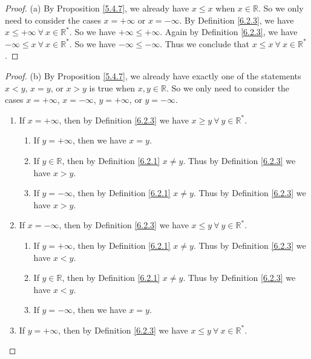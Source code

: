 \begin{proof}{(a)}
By Proposition \ref{5.4.7}, we already have \(x \leq x\) when \(x \in \mathds{R}\).
So we only need to consider the cases \(x = +\infty\) or \(x = -\infty\).
By Definition \ref{6.2.3}, we have \(x \leq +\infty \ \forall\ x \in \mathds{R}^*\).
So we have \(+\infty \leq +\infty\).
Again by Definition \ref{6.2.3}, we have \(-\infty \leq x \ \forall\ x \in \mathds{R}^*\).
So we have \(-\infty \leq -\infty\).
Thus we conclude that \(x \leq x \ \forall\ x \in \mathds{R}^*\).
\end{proof}

\begin{proof}{(b)}
By Proposition \ref{5.4.7}, we already have exactly one of the statements \(x < y\), \(x = y\), or \(x > y\) is true when \(x, y \in \mathds{R}\).
So we only need to consider the cases \(x = +\infty\), \(x = -\infty\), \(y = +\infty\), or \(y = -\infty\).
\begin{enumerate}[label=(\Roman*)]
    \item If \(x = +\infty\), then by Definition \ref{6.2.3} we have \(x \geq y \ \forall\ y \in \mathds{R}^*\).
    \begin{enumerate}[label=(\roman*)]
        \item If \(y = +\infty\), then we have \(x = y\).
        \item If \(y \in \mathds{R}\), then by Definition \ref{6.2.1} \(x \neq y\).
        Thus by Definition \ref{6.2.3} we have \(x > y\).
        \item If \(y = -\infty\), then by Definition \ref{6.2.1} \(x \neq y\).
        Thus by Definition \ref{6.2.3} we have \(x > y\).
    \end{enumerate}
    \item If \(x = -\infty\), then by Definition \ref{6.2.3} we have \(x \leq y \ \forall\ y \in \mathds{R}^*\).
    \begin{enumerate}[label=(\roman*)]
        \item If \(y = +\infty\), then by Definition \ref{6.2.1} \(x \neq y\).
        Thus by Definition \ref{6.2.3} we have \(x < y\).
        \item If \(y \in \mathds{R}\), then by Definition \ref{6.2.1} \(x \neq y\).
        Thus by Definition \ref{6.2.3} we have \(x < y\).
        \item If \(y = -\infty\), then we have \(x = y\).
    \end{enumerate}
    \item If \(y = +\infty\), then by Definition \ref{6.2.3} we have \(x \leq y \ \forall\ x \in \mathds{R}^*\).

\end{enumerate}
\end{proof}
